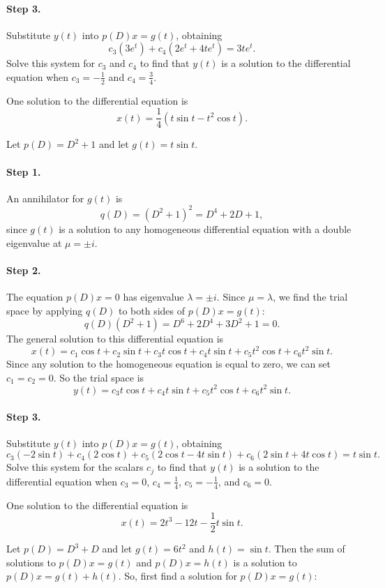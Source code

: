 \documentclass{ximera}
\begin{document}
\paragraph{Step 3.} Substitute $y(t)$ into $p(D)x = g(t)$, obtaining
\[
c_3(3e^t) + c_4(2e^t + 4te^t) = 3te^t.
\]
Solve this system for $c_3$ and $c_4$ to find that $y(t)$ is a solution
to the differential equation when $c_3 = -\frac{1}{2}$ and
$c_4 = \frac{3}{4}$.

 \ans One solution to the differential equation is
\[
x(t) = \frac{1}{4}(t\sin t- t^2\cos t).
\]

\soln Let $p(D) = D^2 + 1$ and let $g(t) = t\sin t$.
\paragraph{Step 1.} An annihilator for $g(t)$ is
\[
q(D) = (D^2 + 1)^2 = D^4 + 2D + 1,
\]
since $g(t)$ is a solution to any homogeneous differential equation
with a double eigenvalue at $\mu = \pm i$.

\paragraph{Step 2.} The equation $p(D)x = 0$ has eigenvalue $\lambda =
\pm i$.  Since $\mu = \lambda$, we find the trial space by applying
$q(D)$ to both sides of $p(D)x = g(t)$:
\[
q(D)(D^2 + 1) = D^6 + 2D^4 + 3D^2 + 1 = 0.
\]
The general solution to this differential equation is
\[
x(t) = c_1\cos t + c_2\sin t + c_3t\cos t + c_4t\sin t + c_5t^2\cos t
+ c_6t^2\sin t.
\]
Since any solution to the homogeneous equation is equal to zero, we can
set $c_1 = c_2 = 0$.  So the trial space is
\[
y(t) = c_3t\cos t + c_4t\sin t + c_5t^2\cos t + c_6t^2\sin t.
\]
\paragraph{Step 3.} Substitute $y(t)$ into $p(D)x = g(t)$, obtaining
\[
c_3(-2\sin t) + c_4(2\cos t) + c_5(2\cos t - 4t\sin t) +
c_6(2\sin t + 4t\cos t) = t\sin t.
\]
Solve this system for the scalars $c_j$ to find that $y(t)$ is a solution
to the differential equation when $c_3 = 0$, $c_4 = \frac{1}{4}$,
$c_5 = -\frac{1}{4}$, and $c_6 = 0$.

 \ans One solution to the differential equation is
\[
x(t) = 2t^3 - 12t - \frac{1}{2}t\sin t.
\]

\soln Let $p(D) = D^3 + D$ and let $g(t) = 6t^2$ and $h(t) = \sin t$.  Then
the sum of solutions to $p(D)x = g(t)$ and $p(D)x = h(t)$ is a solution to
$p(D)x = g(t) + h(t)$.  So, first find a solution for $p(D)x = g(t)$:
\end{document}
